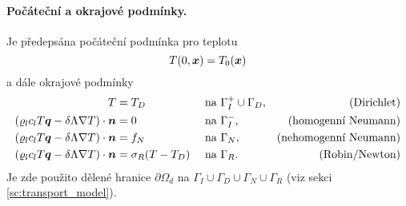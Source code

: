 \paragraph{Počáteční a okrajové podmínky.}
Je předepsána počáteční podmínka pro teplotu
$$ T(0,\vc x) = \hyperA{HeatTransfer-DG-Data::init-temperature}{T_0}(\vc x) $$
a dále okrajové podmínky
\begin{align*}
T &= \hyperA{HeatTransfer-DG-Data::bc-temperature}{T_D} &&\mbox{ na }\Gamma_I^+\cup\Gamma_D, &\mbox{(Dirichlet)}\\
\left(\varrho_l c_l T \vc q - \delta\Lambda\nabla T\right)\cdot\vc n &= 0 &&\mbox{ na }\Gamma_I^-, &\mbox{(homogenní Neumann)}\\
\left(\varrho_l c_l T \vc q - \delta\Lambda\nabla T\right)\cdot\vc n &= \hyperA{HeatTransfer-DG-Data::bc-flux}{f_N} &&\mbox{ na }\Gamma_N, &\mbox{(nehomogenní Neumann)}\\
\left(\varrho_l c_l T \vc q - \delta\Lambda\nabla T\right)\cdot\vc n &= \hyperA{HeatTransfer-DG-Data::bc-robin-sigma}{\sigma_R}(T-\hyperA{HeatTransfer-DG-Data::bc-temperature}{T_D}) &&\mbox{ na }\Gamma_R. &\mbox{(Robin/Newton)}
\end{align*}
Je zde použito dělené hranice $\partial\Omega_d$ na $\Gamma_I\cup\Gamma_D\cup\Gamma_N\cup\Gamma_R$ (viz sekci \ref{sc:transport_model}).






